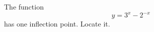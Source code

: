 The function
\begin{equation*}
  y = 3^x-2^{-x}
\end{equation*}
has one inflection point. Locate it.
\answercheck
